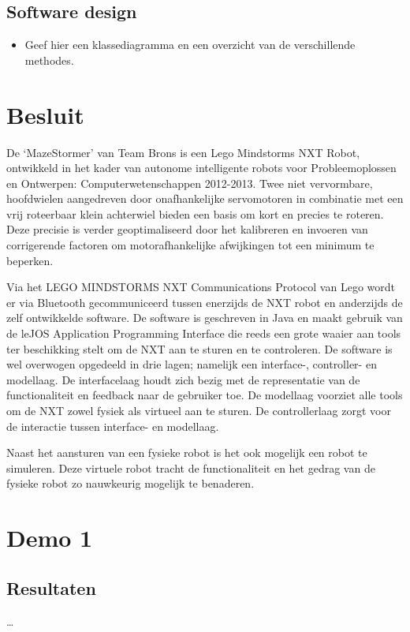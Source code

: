\documentclass[tt1]{penoverslag}
\begin{document}
\subsection{Software design}
\begin{itemize}
\item Geef hier een klassediagramma en een overzicht van de verschillende methodes.
\end{itemize}


\section{Besluit}
De ‘MazeStormer’ van Team Brons is een Lego Mindstorms NXT Robot, ontwikkeld in het kader van autonome intelligente robots voor Probleemoplossen en Ontwerpen: Computerwetenschappen 2012-2013. Twee niet vervormbare, hoofdwielen aangedreven door onafhankelijke servomotoren in combinatie met een vrij roteerbaar klein achterwiel bieden een basis om kort en precies te roteren. Deze precisie is verder geoptimaliseerd door het kalibreren en invoeren van corrigerende factoren om  motorafhankelijke afwijkingen tot een minimum te beperken.

Via het LEGO MINDSTORMS NXT Communications Protocol van Lego wordt er via Bluetooth gecommuniceerd tussen enerzijds de NXT robot en anderzijds de zelf ontwikkelde software. De software is geschreven in Java en maakt gebruik van de leJOS Application Programming Interface die reeds een grote waaier aan tools ter beschikking stelt om de NXT aan te sturen en te controleren. De software is wel overwogen opgedeeld in drie lagen; namelijk een interface-, controller- en modellaag. De interfacelaag houdt zich bezig met de representatie van de functionaliteit en feedback naar de gebruiker toe. De modellaag voorziet alle tools om de NXT zowel fysiek als virtueel aan te sturen. De controllerlaag zorgt voor de interactie tussen interface- en modellaag.

Naast het aansturen van een fysieke robot is het ook mogelijk een robot te simuleren. Deze virtuele robot tracht de functionaliteit en het gedrag van de fysieke robot zo nauwkeurig mogelijk te benaderen.




\newpage
\makeappendix

\section{Demo 1}

\subsection{Resultaten}
\ldots
\end{document}
